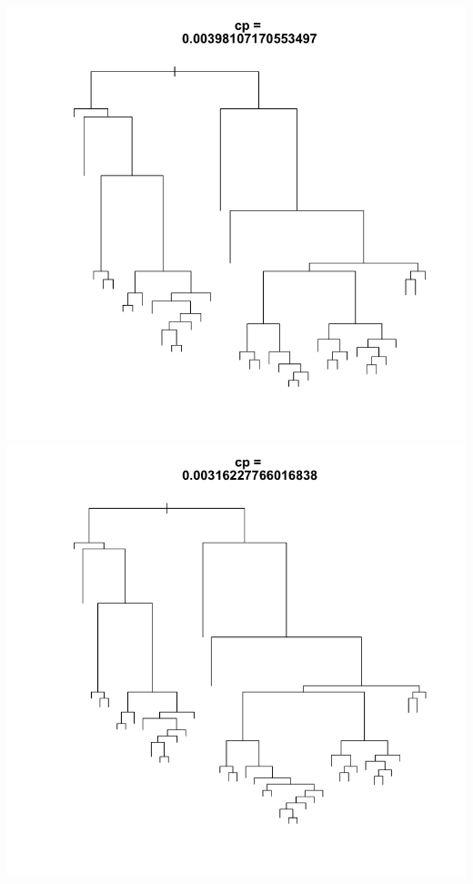 \documentclass[11pt]{article}
\begin{document}
\begin{center}
\includegraphics[scale=0.25]{images/ctrl5}
\includegraphics[scale=0.25]{images/ctrl6}

\end{center}
\end{document}
